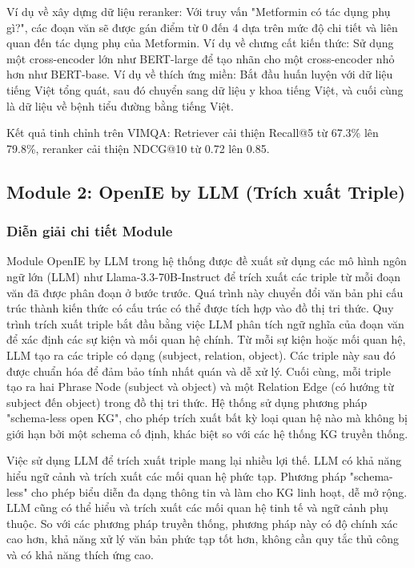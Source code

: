 \documentclass{article}
\begin{document}
Ví dụ về xây dựng dữ liệu reranker: Với truy vấn "Metformin có tác dụng phụ gì?", các đoạn văn sẽ được gán điểm từ 0 đến 4 dựa trên mức độ chi tiết và liên quan đến tác dụng phụ của Metformin. Ví dụ về chưng cất kiến thức: Sử dụng một cross-encoder lớn như BERT-large để tạo nhãn cho một cross-encoder nhỏ hơn như BERT-base. Ví dụ về thích ứng miền: Bắt đầu huấn luyện với dữ liệu tiếng Việt tổng quát, sau đó chuyển sang dữ liệu y khoa tiếng Việt, và cuối cùng là dữ liệu về bệnh tiểu đường bằng tiếng Việt.

Kết quả tinh chỉnh trên VIMQA: Retriever cải thiện Recall@5 từ 67.3\% lên 79.8\%, reranker cải thiện NDCG@10 từ 0.72 lên 0.85.

\subsection{Module 2: OpenIE by LLM (Trích xuất Triple)}

\subsubsection{Diễn giải chi tiết Module}
Module OpenIE by LLM trong hệ thống được đề xuất sử dụng các mô hình ngôn ngữ lớn (LLM) như Llama-3.3-70B-Instruct để trích xuất các triple từ mỗi đoạn văn đã được phân đoạn ở bước trước. Quá trình này chuyển đổi văn bản phi cấu trúc thành kiến thức có cấu trúc có thể được tích hợp vào đồ thị tri thức. Quy trình trích xuất triple bắt đầu bằng việc LLM phân tích ngữ nghĩa của đoạn văn để xác định các sự kiện và mối quan hệ chính. Từ mỗi sự kiện hoặc mối quan hệ, LLM tạo ra các triple có dạng (subject, relation, object). Các triple này sau đó được chuẩn hóa để đảm bảo tính nhất quán và dễ xử lý. Cuối cùng, mỗi triple tạo ra hai Phrase Node (subject và object) và một Relation Edge (có hướng từ subject đến object) trong đồ thị tri thức. Hệ thống sử dụng phương pháp "schema-less open KG", cho phép trích xuất bất kỳ loại quan hệ nào mà không bị giới hạn bởi một schema cố định, khác biệt so với các hệ thống KG truyền thống.

Việc sử dụng LLM để trích xuất triple mang lại nhiều lợi thế. LLM có khả năng hiểu ngữ cảnh và trích xuất các mối quan hệ phức tạp. Phương pháp "schema-less" cho phép biểu diễn đa dạng thông tin và làm cho KG linh hoạt, dễ mở rộng. LLM cũng có thể hiểu và trích xuất các mối quan hệ tinh tế và ngữ cảnh phụ thuộc. So với các phương pháp truyền thống, phương pháp này có độ chính xác cao hơn, khả năng xử lý văn bản phức tạp tốt hơn, không cần quy tắc thủ công và có khả năng thích ứng cao.
\end{document}
